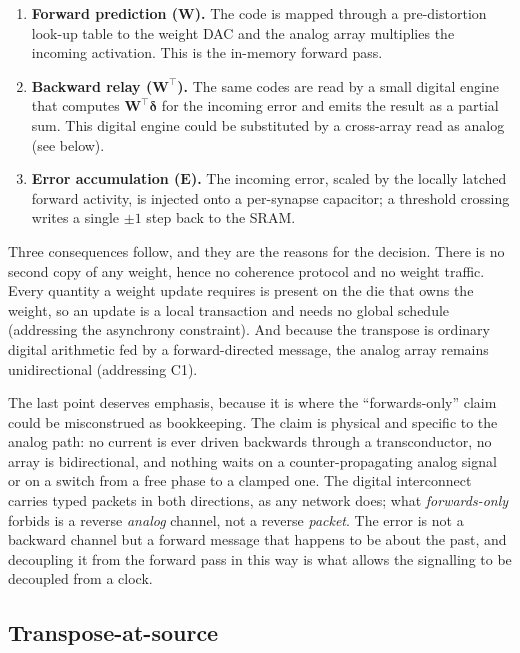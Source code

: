 \documentclass[11pt]{article}
\begin{document}
\begin{enumerate}
\def\labelenumi{\arabic{enumi}.}
\item
  \textbf{Forward prediction (\(\bm W\)).} The code is mapped through a
  pre-distortion look-up table to the weight DAC and the analog array
  multiplies the incoming activation. This is the in-memory forward
  pass.
\item
  \textbf{Backward relay (\(\bm W^{\!\top}\)).} The same codes are read
  by a small digital engine that computes \(\bm W^{\!\top}\bm\delta\)
  for the incoming error and emits the result as a partial sum. This
  digital engine could be substituted by a cross-array read as analog
  (see below).
\item
  \textbf{Error accumulation (\(\bm E\)).} The incoming error, scaled by
  the locally latched forward activity, is injected onto a per-synapse
  capacitor; a threshold crossing writes a single \(\pm1\) step back to
  the SRAM.
\end{enumerate}

Three consequences follow, and they are the reasons for the decision.
There is no second copy of any weight, hence no coherence protocol and
no weight traffic. Every quantity a weight update requires is present on
the die that owns the weight, so an update is a local transaction and
needs no global schedule (addressing the asynchrony constraint). And
because the transpose is ordinary digital arithmetic fed by a
forward-directed message, the analog array remains unidirectional
(addressing C1).

The last point deserves emphasis, because it is where the
``forwards-only'' claim could be misconstrued as bookkeeping. The claim
is physical and specific to the analog path: no current is ever driven
backwards through a transconductor, no array is bidirectional, and
nothing waits on a counter-propagating analog signal or on a switch from
a free phase to a clamped one. The digital interconnect carries typed
packets in both directions, as any network does; what
\emph{forwards-only} forbids is a reverse \emph{analog} channel, not a
reverse \emph{packet}. The error is not a backward channel but a forward
message that happens to be about the past, and decoupling it from the
forward pass in this way is what allows the signalling to be decoupled
from a clock.

\hypertarget{sec:transpose}{%
\subsection{Transpose-at-source}\label{sec:transpose}}
\end{document}
